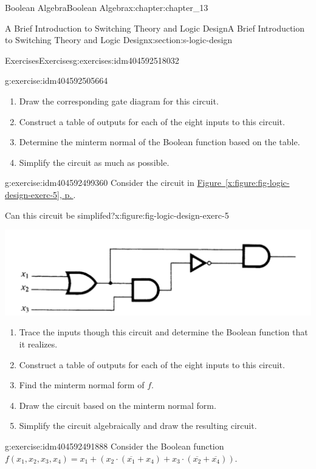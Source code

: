 \documentclass[twoside,10pt,]{book}
\newcommand{\xreffont}{\relax}
\numberwithin{equation}{section}
\begin{document}
\begin{chapterptx}{Boolean Algebra}{}{Boolean Algebra}{}{}{x:chapter:chapter_13}
\begin{sectionptx}{A Brief Introduction to Switching Theory and Logic Design}{}{A Brief Introduction to Switching Theory and Logic Design}{}{}{x:section:s-logic-design}
\begin{exercises-subsection}{Exercises}{}{Exercises}{}{}{g:exercises:idm404592518032}
\begin{divisionexercise}{4}{}{}{g:exercise:idm404592505664}
%
\begin{enumerate}[label=(\alph*)]
\item{}Draw the corresponding gate diagram for this circuit.%
\item{}Construct a table of outputs for each of the eight inputs to this circuit.%
\item{}Determine the minterm normal of the Boolean function based on the table.%
\item{}Simplify the circuit as much as possible.%
\end{enumerate}
%
\end{divisionexercise}%
\begin{divisionexercise}{5}{}{}{g:exercise:idm404592499360}%
Consider the circuit in \hyperref[x:figure:fig-logic-design-exerc-5]{Figure~{\xreffont\ref{x:figure:fig-logic-design-exerc-5}}, p.\,\pageref{x:figure:fig-logic-design-exerc-5}}.%
\begin{figureptx}{Can this circuit be simplifed?}{x:figure:fig-logic-design-exerc-5}{}%
\begin{image}{0}{1}{0}%
\includegraphics[width=\linewidth]{images/fig-logic-design-exerc-5.png}
\end{image}%
\tcblower
\end{figureptx}%
%
\begin{enumerate}[label=(\alph*)]
\item{}Trace the inputs though this circuit and determine the Boolean function that it realizes.%
\item{}Construct a table of outputs for each of the eight inputs to this circuit.%
\item{}Find the minterm normal form of \(f\).%
\item{}Draw the circuit based on the minterm normal form.%
\item{}Simplify the circuit algebraically and draw the resulting circuit.%
\end{enumerate}
%
\end{divisionexercise}%
\begin{divisionexercise}{6}{}{}{g:exercise:idm404592491888}%
Consider the Boolean function \(f\left(x_1, x_2, x_3, x_4\right)=x_1 + \left(x_2 \cdot  \left(\overline{x_1} + x_4\right) + x_3 \cdot  \left(\overline{x_2} + \overline{x_4}\right)\right).\)%

\end{divisionexercise}
\end{exercises-subsection}
\end{sectionptx}
\end{chapterptx}
\end{document}
